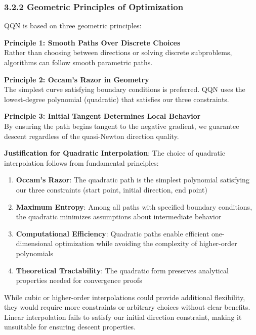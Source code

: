 \hypertarget{geometric-principles-of-optimization}{%
\subsubsection{3.2.2 Geometric Principles of Optimization}\label{geometric-principles-of-optimization}}

QQN is based on three geometric principles:

\textbf{Principle 1: Smooth Paths Over Discrete Choices}\\
Rather than choosing between directions or solving discrete subproblems, algorithms can follow smooth parametric paths.

\textbf{Principle 2: Occam's Razor in Geometry}\\
The simplest curve satisfying boundary conditions is preferred. QQN uses the lowest-degree polynomial (quadratic) that satisfies our three constraints.

\textbf{Principle 3: Initial Tangent Determines Local Behavior}\\
By ensuring the path begins tangent to the negative gradient, we guarantee descent regardless of the quasi-Newton direction quality.

\textbf{Justification for Quadratic Interpolation}: The choice of quadratic interpolation follows from fundamental principles:

\begin{enumerate}
\def\labelenumi{\arabic{enumi}.}
\tightlist
\item
  \textbf{Occam's Razor}: The quadratic path is the simplest polynomial satisfying our three constraints (start point, initial direction, end point)
\item
  \textbf{Maximum Entropy}: Among all paths with specified boundary conditions, the quadratic minimizes assumptions about intermediate behavior
\item
  \textbf{Computational Efficiency}: Quadratic paths enable efficient one-dimensional optimization while avoiding the complexity of higher-order polynomials
\item
  \textbf{Theoretical Tractability}: The quadratic form preserves analytical properties needed for convergence proofs
\end{enumerate}

While cubic or higher-order interpolations could provide additional flexibility, they would require more constraints or arbitrary choices without clear benefits.
Linear interpolation fails to satisfy our initial direction constraint, making it unsuitable for ensuring descent properties.

